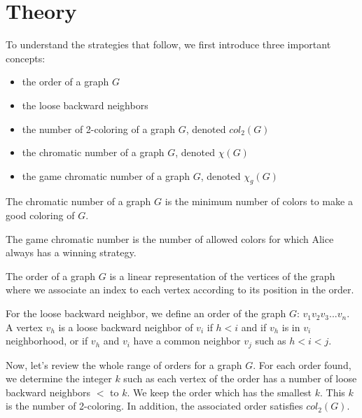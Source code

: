 \chapter{Theory}

To understand the strategies that follow, we first introduce three important concepts:
\begin{itemize}
\item the order of a graph $G$
\item the loose backward neighbors
\item the number of 2-coloring of a graph $G$, denoted $col_{2}(G)$
\item the chromatic number of a graph $G$, denoted $\chi(G)$
\item the game chromatic number of a graph $G$, denoted $\chi_{g}(G)$
\end{itemize}


The chromatic number of a graph $G$ is the minimum number of colors to make a good coloring of $G$.

The game chromatic number is the number of allowed colors for which Alice always has a winning strategy.

The order of a graph $G$ is a linear representation of the vertices of the graph where we associate an index to each vertex according to its position in the order.

For the loose backward neighbor, we define an order of the graph $G$: $v_{1} v_{2} v_{3}... v_{n}$. A vertex $v_{h}$ is a loose backward neighbor of $v_{i}$ if $h < i$ and if $v_{h}$ is in $v_{i}$ neighborhood, or if $v_{h}$ and $v_{i}$ have a common neighbor $v_{j}$ such as $ h < i < j$.

Now, let's review the whole range of orders for a graph $G$. For each order found, we determine the integer $k$ such as each vertex of the order has a number of loose backward neighbors $<$ to $k$. We keep the order which has the smallest $k$. This $k$ is the number of 2-coloring. In addition, the associated order satisfies $col_{2}(G)$.





